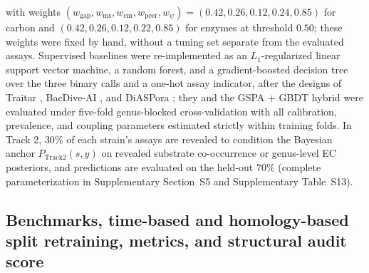 \documentclass[10pt,twocolumn]{article}
\begin{document}
with weights $(w_{\text{gap}}, w_{\text{ms}}, w_{\text{cm}}, w_{\text{peer}}, w_\psi) = (0.42, 0.26, 0.12, 0.24, 0.85)$ for carbon and $(0.42, 0.26, 0.12, 0.22, 0.85)$ for enzymes at threshold $0.50$; these weights were fixed by hand, without a tuning set separate from the evaluated assays. Supervised baselines were re-implemented as an $L_1$-regularized linear support vector machine, a random forest, and a gradient-boosted decision tree over the three binary calls and a one-hot assay indicator, after the designs of Traitar \citep{weimann2016traitar}, BacDive-AI \citep{schober2025bac}, and DiASPora \citep{koblitz2025diaspora}; they and the GSPA + GBDT hybrid were evaluated under five-fold genus-blocked cross-validation with all calibration, prevalence, and coupling parameters estimated strictly within training folds. In Track 2, $30\%$ of each strain's assays are revealed to condition the Bayesian anchor $P_{\text{Track2}}(s, y)$ on revealed substrate co-occurrence or genus-level EC posteriors, and predictions are evaluated on the held-out $70\%$ (complete parameterization in Supplementary Section~S5 and Supplementary Table~S13).

\subsection{Benchmarks, time-based and homology-based split retraining, metrics, and structural audit score}
\end{document}
